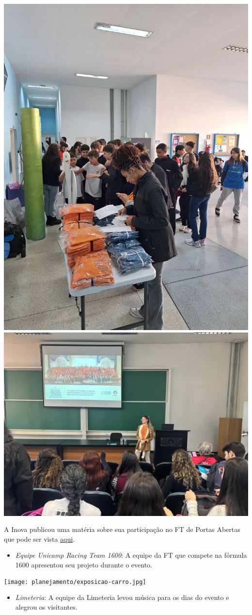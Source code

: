 \documentclass[
  letterpaper,
  DIV=11,
  numbers=noendperiod]{scrreprt}
\providecommand{\tightlist}{%
  \setlength{\itemsep}{0pt}\setlength{\parskip}{0pt}}\usepackage{longtable,booktabs,array}
\begin{document}
\includegraphics[width=0.5\linewidth,height=\textheight,keepaspectratio]{planejamento/participacao-inova.jpg}
\includegraphics[width=0.8\linewidth,height=\textheight,keepaspectratio]{planejamento/palestra-inova.jpg}

A Inova publicou uma matéria sobre sua participação no FT de Portas
Abertas que pode ser vista
\href{https://www.inova.unicamp.br/2025/06/inova-unicamp-apresenta-programa-de-empreendedorismo-para-jovens-durante-o-ft-de-portas-abertas/}{aqui}.

\begin{itemize}
\tightlist
\item
  \emph{Equipe Unicamp Racing Team 1600}: A equipe da FT que compete na
  fórmula 1600 apresentou seu projeto durante o evento.
\end{itemize}

\texttt{[image: planejamento/exposicao-carro.jpg]}

\begin{itemize}
\tightlist
\item
  \emph{Limeteria}: A equipe da Limeteria levou música para os dias do
  evento e alegrou os visitantes.
\end{itemize}
\end{document}

